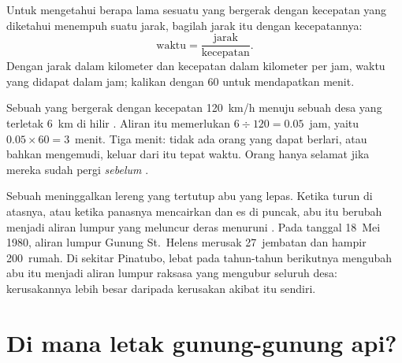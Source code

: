 \begin{method}\label{met:g7:volcanoes:time}
Untuk mengetahui berapa lama sesuatu yang bergerak dengan kecepatan yang
diketahui menempuh suatu jarak, bagilah jarak itu dengan kecepatannya:
\[
\text{waktu} = \frac{\text{jarak}}{\text{kecepatan}}.
\]
Dengan jarak dalam kilometer dan kecepatan dalam kilometer per jam, waktu
yang didapat dalam jam; kalikan dengan 60 untuk mendapatkan menit.
\end{method}

\begin{example}\label{ex:g7:volcanoes:race}
Sebuah  yang bergerak dengan kecepatan \qty{120}{km/h}
menuju sebuah desa yang terletak \qty{6}{km} di hilir . Aliran itu
memerlukan $6 \div 120 = 0.05$~jam, yaitu $0.05 \times 60 = 3$~menit. Tiga
menit: tidak ada orang yang dapat berlari, atau bahkan mengemudi, keluar
dari  itu tepat waktu. Orang hanya selamat jika mereka sudah pergi
\emph{sebelum} .
\end{example}

\begin{remark}\label{rem:g7:volcanoes:mudflows}
Sebuah  meninggalkan lereng yang tertutup abu yang lepas. Ketika
 turun di atasnya, atau ketika panasnya mencairkan  dan es di
puncak, abu itu berubah menjadi aliran lumpur yang meluncur deras menuruni
. Pada tanggal 18~Mei 1980, aliran lumpur Gunung St.~Helens merusak
27~jembatan dan hampir 200~rumah. Di sekitar Pinatubo,  lebat pada
tahun-tahun berikutnya mengubah abu itu menjadi aliran lumpur raksasa yang
mengubur seluruh desa: kerusakannya lebih besar daripada kerusakan akibat
 itu sendiri.
\end{remark}


\section{Di mana letak gunung-gunung api?}

